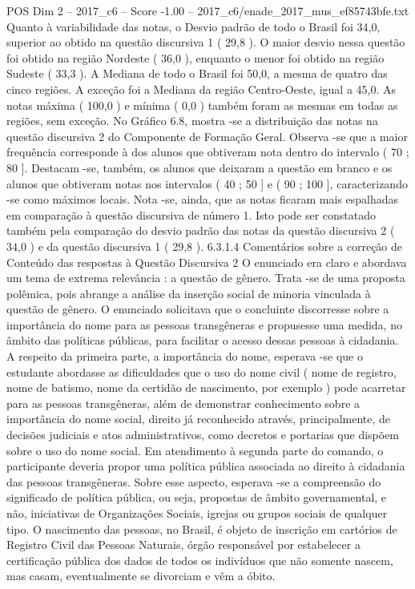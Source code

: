 \begin{textsample}{POS Dim 2 – 2017\_c6 – Score -1.00 – 2017\_c6/enade\_2017\_mus\_ef85743bfe.txt}
Quanto à variabilidade das notas, o Desvio padrão de todo o Brasil foi 34,0, superior ao obtido na questão discursiva 1 ( 29,8 ).
O maior desvio nessa questão foi obtido na região Nordeste ( 36,0 ), enquanto o menor foi obtido na região Sudeste ( 33,3 ).
A Mediana de todo o Brasil foi 50,0, a mesma de quatro das cinco regiões.
A exceção foi a Mediana da região Centro-Oeste, igual a 45,0.
As notas máxima ( 100,0 ) e mínima ( 0,0 ) também foram as mesmas em todas as regiões, sem exceção.
No Gráfico 6.8, mostra -se a distribuição das notas na questão discursiva 2 do Componente de Formação Geral.
Observa -se que a maior frequência corresponde à dos alunos que obtiveram nota dentro do intervalo ( 70 ; 80 ].
Destacam -se, também, os alunos que deixaram a questão em branco e os alunos que obtiveram notas nos intervalos ( 40 ; 50 ] e ( 90 ; 100 ], caracterizando -se como máximos locais.
Nota -se, ainda, que as notas ficaram mais espalhadas em comparação à questão discursiva de número 1.
Isto pode ser constatado também pela comparação do desvio padrão das notas da questão discursiva 2 ( 34,0 ) e da questão discursiva 1 ( 29,8 ). 6.3.1.4 Comentários sobre a correção de Conteúdo das respostas à Questão Discursiva 2 O enunciado era claro e abordava um tema de extrema relevância : a questão de gênero.
Trata -se de uma proposta polêmica, pois abrange a análise da inserção social de minoria vinculada à questão de gênero.
O enunciado solicitava que o concluinte discorresse sobre a importância do nome para as pessoas transgêneras e propusesse uma medida, no âmbito das políticas públicas, para facilitar o acesso dessas pessoas à cidadania.
A respeito da primeira parte, a importância do nome, esperava -se que o estudante abordasse as dificuldades que o uso do nome civil ( nome de registro, nome de batismo, nome da certidão de nascimento, por exemplo ) pode acarretar para as pessoas transgêneras, além de demonstrar conhecimento sobre a importância do nome social, direito já reconhecido através, principalmente, de decisões judiciais e atos administrativos, como decretos e portarias que dispõem sobre o uso do nome social.
Em atendimento à segunda parte do comando, o participante deveria propor uma política pública associada ao direito à cidadania das pessoas transgêneras.
Sobre esse aspecto, esperava -se a compreensão do significado de política pública, ou seja, propostas de âmbito governamental, e não, iniciativas de Organizações Sociais, igrejas ou grupos sociais de qualquer tipo.
O nascimento das pessoas, no Brasil, é objeto de inscrição em cartórios de Registro Civil das Pessoas Naturais, órgão responsável por estabelecer a certificação pública dos dados de todos os indivíduos que não somente nascem, mas casam, eventualmente se divorciam e vêm a óbito.

\end{textsample}
